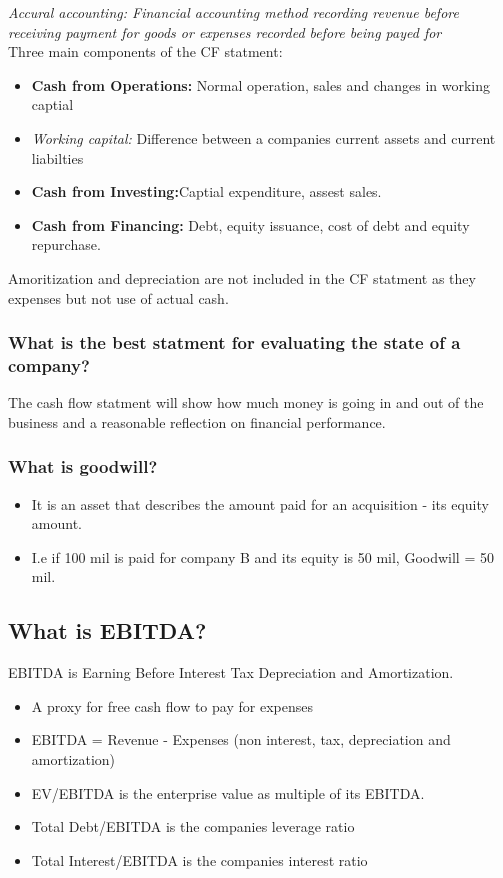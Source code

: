 \documentclass[11pt]{scrartcl} %
\begin{document}
\textit{Accural accounting: Financial accounting method recording revenue before receiving payment for goods or expenses recorded before being payed for}\\

Three main components of the CF statment:

\begin{itemize}
	\item \textbf{Cash from Operations:} Normal operation, sales and changes in working captial
	\item \textit{Working capital:} Difference between a companies current assets and current liabilties
	\item \textbf{Cash from Investing:}Captial expenditure, assest sales. 
	\item \textbf{Cash from Financing:} Debt, equity issuance, cost of debt and equity repurchase.
\end{itemize}

Amoritization and depreciation are not included in the CF statment as they expenses but not use of actual cash.

\subsubsection{What is the best statment for evaluating the state of a company?}

The cash flow statment will show how much money is going in and out of the business and a reasonable reflection on financial performance.

\subsubsection{What is goodwill?}

\begin{itemize}
	\item It is an asset that describes the amount paid for an acquisition - its equity amount.
	\item I.e if 100 mil is paid for company B and its equity is 50 mil, Goodwill = 50 mil.
\end{itemize}

\subsection{What is EBITDA?}

EBITDA is Earning Before Interest Tax Depreciation and Amortization. 

\begin{itemize}
	\item A proxy for free cash flow to pay for expenses
	\item EBITDA = Revenue - Expenses (non interest, tax, depreciation and amortization)
	\item EV/EBITDA is the enterprise value as multiple of its EBITDA.
	\item Total Debt/EBITDA is the companies leverage ratio
	\item Total Interest/EBITDA is the companies interest ratio
\end{itemize}
\end{document}
